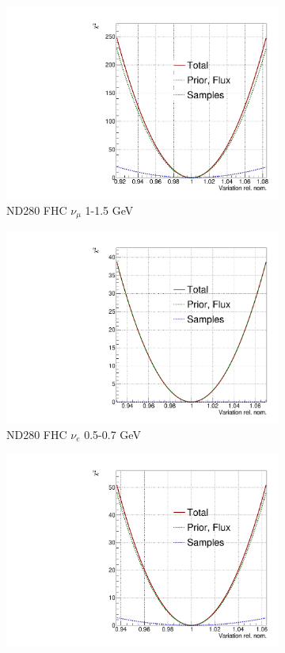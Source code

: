 \begin{figure}
\centering
\begin{subfigure}{.49\textwidth}
  \centering
  \includegraphics[width=0.7\linewidth]{figs/llh/b_5_llh.pdf}
  \caption{ND280 FHC $\nu_{\mu}$ 1-1.5 GeV}
\end{subfigure}
\begin{subfigure}{.49\textwidth}
  \centering
  \includegraphics[width=0.7\linewidth]{figs/llh/b_12_llh.pdf}
  \caption{ND280 FHC $\nu_{e}$ 0.5-0.7 GeV}
\end{subfigure}
\begin{subfigure}{.49\textwidth}
  \centering
  \includegraphics[width=0.7\linewidth]{figs/llh/b_36_llh.pdf}

\end{subfigure}
\end{figure}
